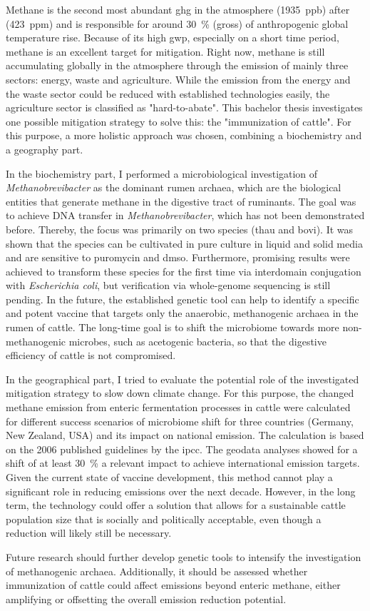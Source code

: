 
Methane is the second most abundant \acrlong{ghg} in the atmosphere (1935~ppb) after  (423~ppm) and is responsible for around 30~\% (\gls{gross}) of anthropogenic global temperature rise. Because of its high \acrlong{gwp}, especially on a short time period, methane is an excellent target for mitigation. Right now, methane is still accumulating globally in the atmosphere through the emission of mainly three sectors: energy, waste and agriculture. While the emission from the energy and the waste sector could be reduced with established technologies easily, the agriculture sector is classified as "hard-to-abate". This bachelor thesis investigates one possible mitigation strategy to solve this: the "immunization of cattle". For this purpose, a more holistic approach was chosen, combining a biochemistry and a geography part. 

In the biochemistry part, I performed a microbiological investigation of \textit{Methanobrevibacter} as the dominant rumen archaea, which are the biological entities that generate methane in the digestive tract of ruminants. The goal was to achieve DNA transfer in \textit{Methanobrevibacter}, which has not been demonstrated before. Thereby, the focus was primarily on two species (\acrlong{thau} and \acrlong{bovi}). It was shown that the species can be cultivated in pure culture in liquid and solid media and are sensitive to puromycin and \acrshort{dmso}. Furthermore, promising results were achieved to transform these species for the first time via interdomain conjugation with \textit{Escherichia coli}, but verification via whole-genome sequencing is still pending. In the future, the established genetic tool can help to identify a specific and potent vaccine that targets only the anaerobic, methanogenic archaea in the rumen of cattle. The long-time goal is to shift the microbiome towards more non-methanogenic microbes, such as acetogenic bacteria, so that the digestive efficiency of cattle is not compromised.

In the geographical part, I tried to evaluate the potential role of the investigated mitigation strategy to slow down climate change. For this purpose, the changed methane emission from enteric fermentation processes in cattle were calculated for different success scenarios of microbiome shift for three countries (Germany, New Zealand, USA) and its impact on national  emission. The calculation is based on the 2006 published guidelines by the \acrshort{ipcc}. The geodata analyses showed for a shift of at least 30~\% a relevant impact to achieve international emission targets. Given the current state of vaccine development, this method cannot play a significant role in reducing emissions over the next decade. However, in the long term, the technology could offer a solution that allows for a sustainable cattle population size that is socially and politically acceptable, even though a reduction will likely still be necessary.

Future research should further develop genetic tools to intensify the investigation of methanogenic archaea. Additionally, it should be assessed whether immunization of cattle could affect emissions beyond enteric methane, either amplifying or offsetting the overall emission reduction potential.

